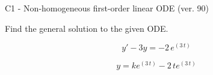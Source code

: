 \begin{exercise}
  \begin{exerciseTitle}C1 - Non-homogeneous first-order linear ODE (ver. 90)\end{exerciseTitle}
  \begin{exerciseStatement}
    
Find the general solution to the given ODE.

    
\[y'-3y= -2 \, e^{\left(3 \, t\right)}\]

  \end{exerciseStatement}
  \begin{exerciseAnswer}
    
\[y= k e^{\left(3 \, t\right)} - 2 \, t e^{\left(3 \, t\right)}\]

  \end{exerciseAnswer}
\end{exercise}